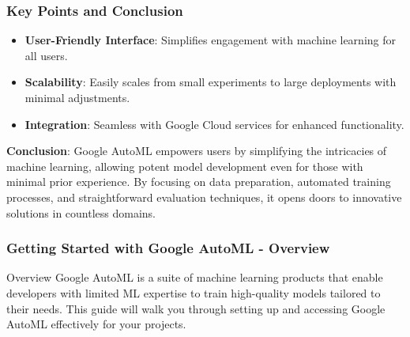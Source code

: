 \documentclass[aspectratio=169]{beamer}
\begin{document}
\begin{frame}[fragile]
    \frametitle{Key Points and Conclusion}
    \begin{itemize}
        \item \textbf{User-Friendly Interface}: Simplifies engagement with machine learning for all users.
        \item \textbf{Scalability}: Easily scales from small experiments to large deployments with minimal adjustments.
        \item \textbf{Integration}: Seamless with Google Cloud services for enhanced functionality.
    \end{itemize}
    
    \textbf{Conclusion}: Google AutoML empowers users by simplifying the intricacies of machine learning, allowing potent model development even for those with minimal prior experience. By focusing on data preparation, automated training processes, and straightforward evaluation techniques, it opens doors to innovative solutions in countless domains.
\end{frame}

\begin{frame}[fragile]
    \frametitle{Getting Started with Google AutoML - Overview}
    \begin{block}{Overview}
        Google AutoML is a suite of machine learning products that enable developers with limited ML expertise to train high-quality models tailored to their needs. 
        This guide will walk you through setting up and accessing Google AutoML effectively for your projects.
    \end{block}
\end{frame}
\end{document}
